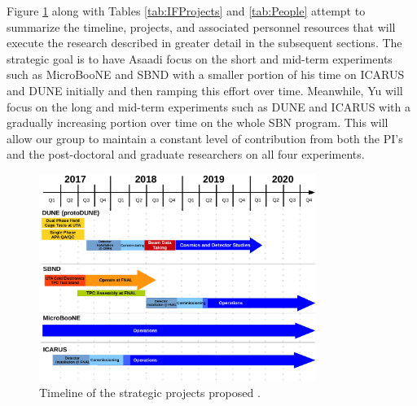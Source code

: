 Figure \ref{fig:IFTimeline} along with Tables \ref{tab:IFProjects} and \ref{tab:People} attempt to summarize the timeline, projects, and associated personnel resources that will execute the research described in greater detail in the subsequent sections. The strategic goal is to have Asaadi focus on the short and mid-term experiments such as MicroBooNE and SBND with a smaller portion of his time on ICARUS and DUNE initially and then ramping this effort over time. Meanwhile, Yu will focus on the long and mid-term experiments such as DUNE and ICARUS with a gradually increasing portion over time on the whole SBN program. This will allow our group to maintain a constant level of contribution from both the PI's and the post-doctoral and graduate researchers on all four experiments.


\begin{figure}[htb]
\centering
\includegraphics[width=0.80\textwidth]{images/Timeline.pdf}
\caption[]{Timeline of the strategic projects proposed .}
\label{fig:IFTimeline}
\end{figure}

